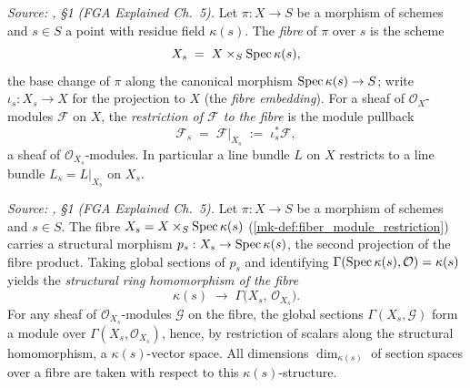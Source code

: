 \begin{definition}\label{mk-def:fiber_module_restriction}
  \leanok

  \textit{Source: \cite{nitsure-hilbert-quot}, \S 1 (FGA Explained Ch.~5).}
  Let \(\pi : X \to S\) be a morphism of schemes and \(s \in S\) a point with
  residue field \(\kappa(s)\). The \emph{fibre} of \(\pi\) over \(s\) is the
  scheme
  \[
    X_s \;=\; X \times_S \operatorname{Spec} \kappa(s),
  \]
  the base change of \(\pi\) along the canonical morphism
  \(\operatorname{Spec} \kappa(s) \to S\); write \(\iota_s : X_s \to X\) for the projection
  to \(X\) (the \emph{fibre embedding}). For a sheaf of
  \(\mathcal{O}_X\)-modules \(\mathcal{F}\) on \(X\), the \emph{restriction of
  \(\mathcal{F}\) to the fibre} is the module pullback
  \[
    \mathcal{F}_s \;=\; \mathcal{F}|_{X_s} \;:=\; \iota_s^{*} \mathcal{F},
  \]
  a sheaf of \(\mathcal{O}_{X_s}\)-modules. In particular a line bundle \(L\)
  on \(X\) restricts to a line bundle \(L_s = L|_{X_s}\) on \(X_s\).
\end{definition}

\begin{definition}\label{mk-def:fiber_sections_module}
  \leanok

  \textit{Source: \cite{nitsure-hilbert-quot}, \S 1 (FGA Explained Ch.~5).}
  Let \(\pi : X \to S\) be a morphism of schemes and \(s \in S\). The fibre
  \(X_s = X \times_S \operatorname{Spec} \kappa(s)\) (\ref{mk-def:fiber_module_restriction})
  carries a structural morphism \(p_s : X_s \to \operatorname{Spec} \kappa(s)\), the second
  projection of the fibre product. Taking global sections of \(p_s\) and
  identifying \(\Gamma(\operatorname{Spec} \kappa(s), \mathcal{O}) = \kappa(s)\) yields the
  \emph{structural ring homomorphism of the fibre}
  \[
    \kappa(s) \;\longrightarrow\; \Gamma\bigl(X_s,\, \mathcal{O}_{X_s}\bigr).
  \]
  For any sheaf of \(\mathcal{O}_{X_s}\)-modules \(\mathcal{G}\) on the fibre,
  the global sections \(\Gamma(X_s, \mathcal{G})\) form a module over
  \(\Gamma(X_s, \mathcal{O}_{X_s})\), hence, by restriction of scalars along
  the structural homomorphism, a \(\kappa(s)\)-vector space. All dimensions
  \(\dim_{\kappa(s)}\) of section spaces over a fibre are taken with respect
  to this \(\kappa(s)\)-structure.
\end{definition}

